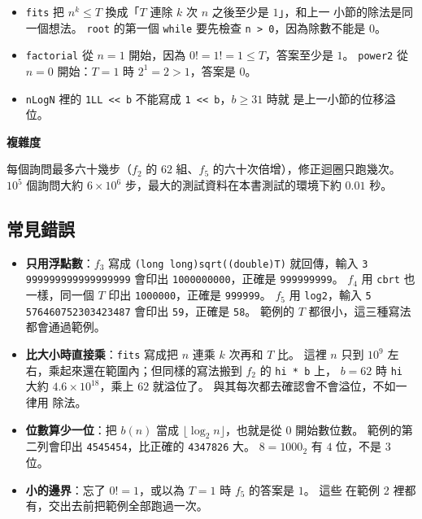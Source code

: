 
\begin{itemize}
\item \texttt{fits} 把 $n^k \le T$ 換成「$T$ 連除 $k$ 次 $n$ 之後至少是 $1$」，和上一
小節的除法是同一個想法。 \texttt{root} 的第一個 \texttt{while} 要先檢查
\texttt{n > 0}，因為除數不能是 $0$。
\item \texttt{factorial} 從 $n = 1$ 開始，因為 $0! = 1! = 1 \le T$，答案至少是 $1$。
\texttt{power2} 從 $n = 0$ 開始：$T = 1$ 時 $2^1 = 2 > 1$，答案是 $0$。
\item \texttt{nLogN} 裡的 \texttt{1LL << b} 不能寫成 \texttt{1 << b}，$b \ge 31$ 時就
是上一小節的位移溢位。
\end{itemize}

\textbf{複雜度}

每個詢問最多六十幾步（$f_2$ 的 $62$ 組、$f_5$ 的六十次倍增），修正迴圈只跑幾次。
$10^5$ 個詢問大約 $6 \times 10^6$ 步，最大的測試資料在本書測試的環境下約 $0.01$ 秒。

\subsection{常見錯誤}

\begingroup\sloppy
\begin{itemize}
\item \textbf{只用浮點數}：$f_3$ 寫成 \texttt{(long long)sqrt((double)T)} 就回傳，輸入
\texttt{3 999999999999999999} 會印出 \texttt{1000000000}，正確是 \texttt{999999999}。
$f_4$ 用 \texttt{cbrt} 也一樣，同一個 $T$ 印出 \texttt{1000000}，正確是
\texttt{999999}。 $f_5$ 用 \texttt{log2}，輸入 \texttt{5 576460752303423487} 會印出
\texttt{59}，正確是 \texttt{58}。 範例的 $T$ 都很小，這三種寫法都會通過範例。
\item \textbf{比大小時直接乘}：\texttt{fits} 寫成把 $n$ 連乘 $k$ 次再和 $T$ 比。 這裡
$n$ 只到 $10^9$ 左右，乘起來還在範圍內；但同樣的寫法搬到 $f_2$ 的 \texttt{hi * b} 上，
$b = 62$ 時 \texttt{hi} 大約 $4.6 \times 10^{18}$，乘上 $62$ 就溢位了。 與其每次都去確認會不會溢位，不如一律用
除法。
\item \textbf{位數算少一位}：把 $b(n)$ 當成 $\lfloor \log_2 n \rfloor$，也就是從 $0$
開始數位數。 範例的第二列會印出 \texttt{4545454}，比正確的 \texttt{4347826} 大。
$8 = 1000_2$ 有 $4$ 位，不是 $3$ 位。
\item \textbf{小的邊界}：忘了 $0! = 1$，或以為 $T = 1$ 時 $f_5$ 的答案是 $1$。 這些
在範例 2 裡都有，交出去前把範例全部跑過一次。
\end{itemize}
\endgroup

